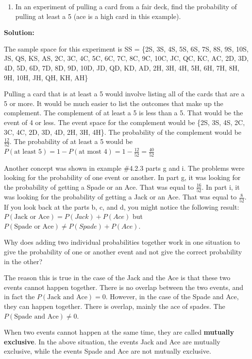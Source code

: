 \documentclass[
]{book}
\providecommand{\tightlist}{%
  \setlength{\itemsep}{0pt}\setlength{\parskip}{0pt}}
\begin{document}
\begin{enumerate}
\def\labelenumi{\alph{enumi}.}
\setcounter{enumi}{1}
\tightlist
\item
  In an experiment of pulling a card from a fair deck, find the probability of pulling at least a 5 (ace is a high card in this example).
\end{enumerate}

\textbf{Solution:}

The sample space for this experiment is SS = \{2S, 3S, 4S, 5S, 6S, 7S, 8S, 9S, 10S, JS, QS, KS, AS, 2C, 3C, 4C, 5C, 6C, 7C, 8C, 9C, 10C, JC, QC, KC, AC, 2D, 3D, 4D, 5D, 6D, 7D, 8D, 9D, 10D, JD, QD, KD, AD, 2H, 3H, 4H, 5H, 6H, 7H, 8H, 9H, 10H, JH, QH, KH, AH\}

Pulling a card that is at least a 5 would involve listing all of the cards that are a 5 or more. It would be much easier to list the outcomes that make up the complement. The complement of at least a 5 is less than a 5. That would be the event of 4 or less. The event space for the complement would be \{2S, 3S, 4S, 2C, 3C, 4C, 2D, 3D, 4D, 2H, 3H, 4H\}. The probability of the complement would be \(\frac{12}{52}\). The probability of at least a 5 would be \(P(\text{at least 5})=1-P(\text{at most 4})=1-\frac{12}{52}=\frac{40}{52}\)

Another concept was shown in example \#4.2.3 parts g and i. The problems were looking for the probability of one event or another. In part g, it was looking for the probability of getting a Spade or an Ace. That was equal to \(\frac{16}{52}\). In part i, it was looking for the probability of getting a Jack or an Ace. That was equal to \(\frac{8}{52}\). If you look back at the parts b, c, and d, you might notice the following result: \(P(\text{Jack or Ace})=P(Jack)+P(Ace)\) but \(P(\text{Spade or Ace})\ne P(Spade)+P(Ace)\).

Why does adding two individual probabilities together work in one situation to give the probability of one or another event and not give the correct probability in the other?

The reason this is true in the case of the Jack and the Ace is that these two events cannot happen together. There is no overlap between the two events, and in fact the \(P(\text{Jack and Ace})=0\). However, in the case of the Spade and Ace, they can happen together. There is overlap, mainly the ace of spades. The \(P(\text{Spade and Ace})\ne0\).

When two events cannot happen at the same time, they are called \textbf{mutually exclusive}. In the above situation, the events Jack and Ace are mutually exclusive, while the events Spade and Ace are not mutually exclusive.
\end{document}
